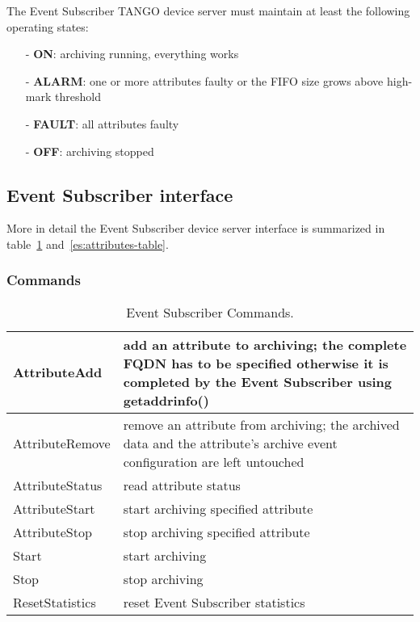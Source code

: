 \documentclass[11pt,a4paper]{article}
\def \es{Event Subscriber}
\def \tango{TANGO}
\begin{document}
The \es{} \tango{} device server must maintain at least
the following operating states:
\begin{itemize}
	\item[-]\textbf{ON}: archiving running, everything works
	\item[-]\textbf{ALARM}: one or more attributes faulty or the
					FIFO size grows above high-mark threshold
	\item[-]\textbf{FAULT}: all attributes faulty
	\item[-]\textbf{OFF}: archiving stopped
\end{itemize}

\subsection{\es{} interface}
\label{es-interface}
More in detail the \es{} device server interface is summarized in
table~\ref{es:commands-table} and~\ref{es:attributes-table}.

\subsubsection{Commands}
\label{es:commands}
\begin{table}[H]
	\begin{tabular}{p{}|p{}}
		\hline
		AttributeAdd &
		add an attribute to archiving; the complete FQDN has to be specified
		otherwise it is completed by the \es{} using getaddrinfo() \\
		\hline
		AttributeRemove &
		remove an attribute from archiving; the archived data
		and the attribute's archive event configuration are left untouched\\
		\hline
		AttributeStatus & read attribute status \\
		\hline
		AttributeStart & start archiving specified attribute \\
		\hline
		AttributeStop & stop archiving specified attribute \\
		\hline
		Start & start archiving \\
		\hline
		Stop & stop archiving \\
		\hline
		ResetStatistics & reset \es{} statistics \\
		\hline
	\end{tabular}
	\caption{\es{} Commands.}
	\label{es:commands-table}
\end{table}
\end{document}
